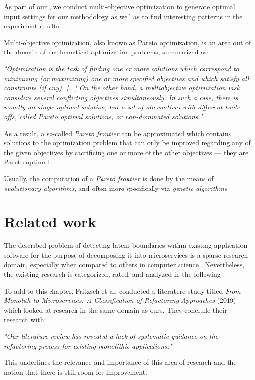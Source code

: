 \documentclass[12pt,a4paper]{report}
\begin{document}
As part of our \textit{}, we conduct
multi\hyp objective optimization to generate optimal input settings for our
methodology as well as to find interesting patterns in the experiment results.

Multi-objective optimization, also known as Pareto optimization, is an area
out of the domain of mathematical optimization problems, summarized as:
\begin{displayquote}
  \emph{
  "Optimization is the task of finding one or more solutions which correspond to
  minimizing (or maximizing) one or more specified objectives and which satisfy
  all constraints (if any). [...] On the other hand, a multiobjective
  optimization task considers several conflicting objectives simultaneously.
  In such a case, there is usually no single optimal solution, but a set of
  alternatives with different trade-offs, called Pareto optimal solutions,
  or non-dominated solutions."
  }~\cite{deb2014multi}
\end{displayquote}

As a result, a so-called \textit{Pareto frontier} can be approximated which
contains solutions to the optimization problem that can only be improved
regarding any of the given objectives by sacrificing one or more of the other
objectives --- they are Pareto\hyp optimal \cite{deb2014multi}.

Usually, the computation of a \textit{Pareto frontier} is done by the means of
\textit{evolutionary algorithms}, and often more specifically via
\textit{genetic algorithms} \cite{deb2014multi}.




\chapter{Related work} \label{chap:related}

The described problem of detecting latent boundaries within existing
application software for the purpose of decomposing it into microservices is a
sparse research domain, especially when compared to others in computer science
\cite{fritzsch2018monolith}. Nevertheless, the existing research is
categorized, rated, and analyzed in the following
\textit{}.

To add to this chapter, Fritzsch et al. conducted a literature study titled
\textit{From Monolith to Microservices: A Classification of Refactoring
Approaches} (2019) \cite{fritzsch2018monolith} which looked at research in the
same domain as ours. They conclude their research with:
\begin{displayquote}
  \emph{
  "Our literature review has revealed a lack of systematic guidance on the
  refactoring process for existing monolithic applications."
  }~\cite{fritzsch2018monolith}
\end{displayquote}
This underlines the relevance and importance of this area of research
and the notion that there is still room for improvement.
\newpage
\end{document}
